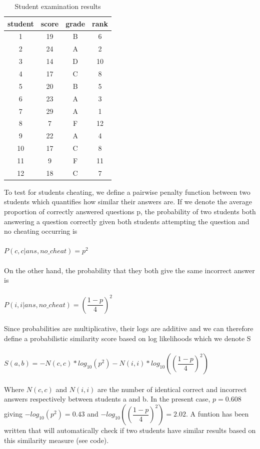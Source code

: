 \documentclass{article}
\begin{document}
\begin{table}[h]
\centering
\begin{tabular}{ |c|c|c|c|}
\hline
student & score & grade & rank \\
\hline
1 & 19&B &6 \\
2 & 24&A & 2\\
3 & 14& D& 10\\
4 & 17& C& 8\\
5 & 20& B& 5\\
6 & 23& A& 3\\
7 & 29& A& 1\\
8 & 7& F& 12\\
9 & 22&A & 4\\
10 &17 & C& 8\\
11 & 9& F& 11\\
12 & 18& C& 7\\
\hline

\end{tabular}
\caption{Student examination results}
\label{tab:score}
\end{table}


To test for students cheating, we define a pairwise penalty function between two students which quantifies how similar their answers are. If we denote the average proportion of correctly answered questions p, the probability of two students both answering a question correctly given both students attempting the question and no cheating occurring is\\\\
$P(c,c | ans, no\_cheat) = p^2$\\\\
On the other hand, the probability that they both give the same incorrect answer is\\\\
$P(i,i | ans, no\_cheat) = (\dfrac{1-p}{4})^2$\\\\
Since probabilities are multiplicative, their logs are additive and we can therefore define a probabilistic similarity score based on log likelihoods which we denote S\\\\
 $S(a,b) = -N(c,c)*log_{10}(p^2) - N(i,i)*log_{10}((\dfrac{1-p}{4})^2)$\\\\
Where $N(c,c)$ and $N(i,i)$ are the number of identical correct and incorrect answers respectively between students a and b. In the present case, $p = 0.608$ giving $-log_{10}(p^2) = 0.43$ and $-log_{10}((\dfrac{1-p}{4})^2)=2.02$. A funtion has been written that will automatically check if two students have similar results based on this similarity measure (see code).
\end{document}
